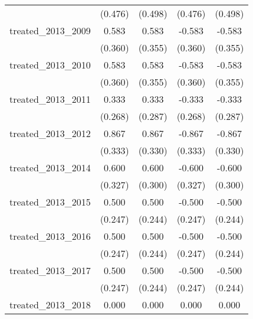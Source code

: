 {\begin{tabular}{l*{4}{c}}
            &     (0.476)         &     (0.498)         &     (0.476)         &     (0.498)         \\
[1em]
treated\_2013\_2009&       0.583         &       0.583         &      -0.583         &      -0.583         \\
            &     (0.360)         &     (0.355)         &     (0.360)         &     (0.355)         \\
[1em]
treated\_2013\_2010&       0.583         &       0.583         &      -0.583         &      -0.583         \\
            &     (0.360)         &     (0.355)         &     (0.360)         &     (0.355)         \\
[1em]
treated\_2013\_2011&       0.333         &       0.333         &      -0.333         &      -0.333         \\
            &     (0.268)         &     (0.287)         &     (0.268)         &     (0.287)         \\
[1em]
treated\_2013\_2012&       0.867\sym{**} &       0.867\sym{**} &      -0.867\sym{**} &      -0.867\sym{**} \\
            &     (0.333)         &     (0.330)         &     (0.333)         &     (0.330)         \\
[1em]
treated\_2013\_2014&       0.600         &       0.600\sym{*}  &      -0.600         &      -0.600\sym{*}  \\
            &     (0.327)         &     (0.300)         &     (0.327)         &     (0.300)         \\
[1em]
treated\_2013\_2015&       0.500\sym{*}  &       0.500\sym{*}  &      -0.500\sym{*}  &      -0.500\sym{*}  \\
            &     (0.247)         &     (0.244)         &     (0.247)         &     (0.244)         \\
[1em]
treated\_2013\_2016&       0.500\sym{*}  &       0.500\sym{*}  &      -0.500\sym{*}  &      -0.500\sym{*}  \\
            &     (0.247)         &     (0.244)         &     (0.247)         &     (0.244)         \\
[1em]
treated\_2013\_2017&       0.500\sym{*}  &       0.500\sym{*}  &      -0.500\sym{*}  &      -0.500\sym{*}  \\
            &     (0.247)         &     (0.244)         &     (0.247)         &     (0.244)         \\
[1em]
treated\_2013\_2018&       0.000         &       0.000         &       0.000         &       0.000         \\

\end{tabular}}
